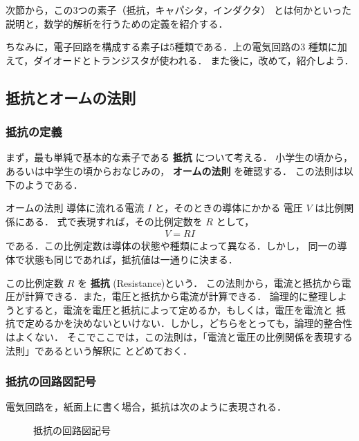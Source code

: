         次節から，この3つの素子（抵抗，キャパシタ，インダクタ）
        とは何かといった説明と，数学的解析を行うための定義を紹介する．

        ちなみに，電子回路を構成する素子は5種類である．上の電気回路の3
        種類に加えて，ダイオードとトランジスタが使われる．
        また後に，改めて，紹介しよう．

    \subsection{抵抗とオームの法則}
    \subsubsection{抵抗の定義}
        まず，最も単純で基本的な素子である \textbf{抵抗} について考える．
        小学生の頃から，あるいは中学生の頃からおなじみの，
        \textbf{オームの法則} を確認する．
        この法則は以下のようである．
            \begin{myshadebox}{オームの法則}
                導体に流れる電流 $I$ と，そのときの導体にかかる
                電圧 $V$ は比例関係にある．
                式で表現すれば，その比例定数を $R$ として，
                    \begin{align}
                        V=RI
                    \end{align}
                である．この比例定数は導体の状態や種類によって異なる．しかし，
                同一の導体で状態も同じであれば，抵抗値は一通りに決まる．
            \end{myshadebox}

        この比例定数 $R$ を \textbf{抵抗} (Resistance)という．
        この法則から，電流と抵抗から電圧が計算できる．また，電圧と抵抗から電流が計算できる．
        論理的に整理しようとすると，電流を電圧と抵抗によって定めるか，もしくは，電圧を電流と
        抵抗で定めるかを決めないといけない．しかし，どちらをとっても，論理的整合性はよくない．
        そこでここでは，この法則は，「電流と電圧の比例関係を表現する法則」であるという解釈に
        とどめておく．

    \subsubsection{抵抗の回路図記号}\label{subsub:kairozu_kigou_teikou}
        電気回路を，紙面上に書く場合，抵抗は次のように表現される．
                    \begin{figure}[hbt]
                        \begin{center}
                            \caption{抵抗の回路図記号}
                            \label{fig:kairozu_kigou_teikou}
                        \end{center}
                    \end{figure}

